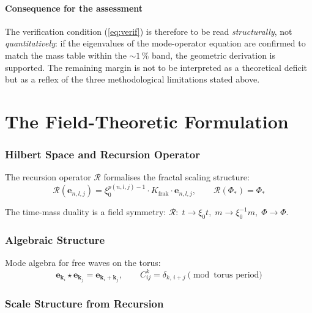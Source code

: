 \subsection*{Consequence for the assessment}

The verification condition (\ref{eq:verif}) is therefore to be read
\emph{structurally}, not \emph{quantitatively}: if the eigenvalues
of the mode-operator equation are confirmed to match the mass table
within the $\sim 1\,\%$ band, the geometric derivation is supported.
The remaining margin is not to be interpreted as a theoretical deficit
but as a reflex of the three methodological limitations stated above.

\part{The Field-Theoretic Formulation}

\section{Hilbert Space and Recursion Operator}

The recursion operator $\mathcal{R}$ formalises the fractal scaling structure:
\begin{equation}
  \mathcal{R}(\mathbf{e}_{n,l,j})
  = \xi_0^{p(n,l,j)-1} \cdot K_{\text{frak}} \cdot \mathbf{e}_{n,l,j},
  \qquad \mathcal{R}(\Phi_*) = \Phi_*
\end{equation}

The time-mass duality is a field symmetry:
$\mathcal{R}:\; t \to \xi_0 t,\; m \to \xi_0^{-1} m,\; \Phi \to \Phi$.

\section{Algebraic Structure}

Mode algebra for free waves on the torus:
\begin{equation}
  \mathbf{e}_{\mathbf{k}_i} \star \mathbf{e}_{\mathbf{k}_j}
  = \mathbf{e}_{\mathbf{k}_i + \mathbf{k}_j},
  \qquad
  C_{ij}^k = \delta_{k,\,i+j} \pmod{\text{torus period}}
\end{equation}

\section{Scale Structure from Recursion}

